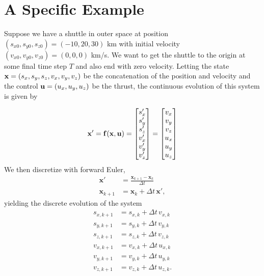 \section*{A Specific Example}

Suppose we have a shuttle in outer space at position $(s_{x0}, s_{y0}, s_{z0}) = (-10, 20, 30)$ km with initial velocity $(v_{x0}, v_{y0}, v_{z0}) = (0, 0, 0)$ km/s.
We want to get the shuttle to the origin at some final time step $T$ and also end with zero velocity.
Letting the state $\mathbf{x} = (s_x, s_y, s_z, v_x, v_y, v_z)$ be the concatenation of the position and velocity and the control $\mathbf{u} = (u_x, u_y, u_z)$ be the thrust, the continuous evolution of this system is given by

\begin{equation}
\mathbf{x}' = \mathbf{f}(\mathbf{x}, \mathbf{u}) =
\begin{bmatrix}
s_x' \\
s_y' \\
s_z' \\
v_x' \\
v_y' \\
v_z'
\end{bmatrix}
=
\begin{bmatrix}
v_x \\
v_y \\
v_z \\
u_x \\
u_y \\
u_z
\end{bmatrix}
\label{eqn:dxdt}
\end{equation}
We then discretize with forward Euler,
\begin{align*}
\mathbf x'&= \frac {\mathbf x_{k+1} - \mathbf x_k} {\Delta t}\\
\mathbf x_{k+1} &= \mathbf x_k + \Delta t \, \mathbf x',
\end{align*}
yielding the discrete evolution of the system
\begin{align*}
s_{x, k+1} &= s_{x, k} + \Delta t \, v_{x, k}\\
s_{y, k+1} &= s_{y, k} + \Delta t \, v_{y, k}\\
s_{z, k+1} &= s_{z, k} + \Delta t \, v_{z, k}\\
v_{x, k+1} &= v_{x, k} + \Delta t \, u_{x, k}\\
v_{y, k+1} &= v_{y, k} + \Delta t \, u_{y, k}\\
v_{z, k+1} &= v_{z, k} + \Delta t \, u_{z, k}.
\end{align*}

